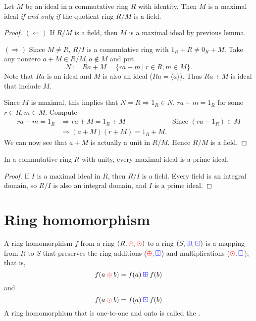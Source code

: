 \begin{theorem}
    Let $M$ be an ideal in a commutative ring $R$ with identity. Then $M$ is a maximal ideal \textit{if and only if}
    the quotient ring $R/M$ is a field. 
\end{theorem}
\begin{proof}
    $(\Leftarrow)$ If $R/M$ is a field, then $M$ is a maximal ideal by previous lemma.

    $(\Rightarrow)$ Since $M \neq R$, $R/I$ is a commutative ring with 
    $1_R + R \neq 0_R + M$. Take any nonzero $a + M \in R/M, a \notin M$ and put 
    \[
        N := Ra + M = \{ ra+m \> | \> r \in R, m \in M \}.
    \]
    Note that $Ra$ is an ideal and $M$ is also an ideal ($Ra = \langle a \rangle$). 
    Thus $Ra + M$ is ideal that include $M$.

    Since $M$ is maximal, this implies that $N = R \Longrightarrow 1_R \in N$. 
    $ra + m = 1_R$ for some $r \in R, m \in M$. Compute 
    \begin{align*}
        ra + m = 1_R &\Rightarrow ra + M = 1_R + M & \text{Since } (ra-1_R) \in M\\
        &\Rightarrow (a+M)(r+M) = 1_R + M.
    \end{align*}
    We can now see that $a+M$ is actually a unit in $R/M$. Hence $R/M$ is a field.
\end{proof}

\begin{corollary}
    In a commutative ring $R$ with unity, every maximal ideal is a prime ideal.
\end{corollary}
\begin{proof}
    If $I$ is a maximal ideal in $R$, then $R/I$ is a field. Every field is an integral domain, so $R/I$ is 
    also an integral domain, and $I$ is a prime ideal.
\end{proof}

\section{Ring homomorphism}

\begin{definition}
    A ring homomorphism $f$ from a ring $(R, {\color{red} \oplus}, {\color{red} \odot})$ to a ring 
    $(S, {\color{blue} \boxplus}, {\color{blue} \boxdot})$ is a mapping from $R$ to $S$ that preserves the 
    ring additions (${\color{red} \oplus}, {\color{blue} \boxplus}$) and multiplications (${\color{red} \odot}, {\color{blue} \boxdot}$); that is, 
    \begin{equation*}
        f(a \> {\color{red} \oplus} \> b) = f(a) \> {\color{blue} \boxplus} \> f(b) 
    \end{equation*}
    and 
    \begin{equation*}
        f(a \> {\color{red} \odot} \> b) = f(a) \> {\color{blue} \boxdot} \> f(b) 
    \end{equation*}
    A ring homomorphism that is one-to-one and onto is called the .
\end{definition}

